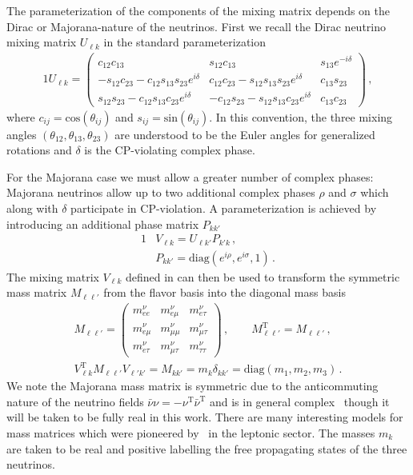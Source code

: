 The parameterization of the components of the mixing matrix depends on the Dirac or Majorana-nature of the neutrinos. First we recall the Dirac neutrino mixing matrix $U_{\ell k}$ in the standard parameterization~\citep{Schwartz:2014sze} 
\begin{alignat}{1}
    \label{rotation:1} U_{\ell k} =
    \begin{pmatrix}
         c_{12}c_{13} & s_{12}c_{13} & s_{13}e^{-i\delta}\\
         -s_{12}c_{23} - c_{12}s_{13}s_{23}e^{i\delta} & c_{12}c_{23} - s_{12}s_{13}s_{23}e^{i\delta} & c_{13}s_{23}\\
         s_{12}s_{23} - c_{12}s_{13}c_{23}e^{i\delta}& -c_{12}s_{23} - s_{12}s_{13}c_{23}e^{i\delta} & c_{13}c_{23}
    \end{pmatrix}\,,
\end{alignat}
where $c_{ij} = \mathrm{cos}(\theta_{ij})$ and $s_{ij} = \mathrm{sin}(\theta_{ij})$. In this convention, the three mixing angles $(\theta_{12}, \theta_{13}, \theta_{23})$ are understood to be the Euler angles for generalized rotations and $\delta$ is the CP-violating complex phase. 

For the Majorana case we must allow a greater number of complex phases: Majorana neutrinos allow up to two additional complex phases $\rho$ and $\sigma$ which along with $\delta$ participate in CP-violation. A parameterization is achieved by introducing an additional phase matrix $P_{kk'}$
\begin{alignat}{1}
    \label{phases:1} &V_{\ell k} = U_{\ell k'}P_{k'k}\,,\\
    \label{phases:3} &P_{kk'} = \mathrm{diag}(e^{i\rho},e^{i\sigma},1)\,.
\end{alignat}
The mixing matrix $V_{\ell k}$ defined in  can then be used to transform the symmetric mass matrix $M_{\ell\ell'}$ from the flavor basis into the diagonal mass basis 
\begin{align}
    \label{diag:0}
    M_{\ell\ell'}=
    \begin{pmatrix}
        m_{ee}^{\nu} & m_{e\mu}^{\nu} & m_{e\tau}^{\nu}\\
        m_{e\mu}^{\nu} & m_{\mu\mu}^{\nu} & m_{\mu\tau}^{\nu}\\
        m_{e\tau}^{\nu} & m_{\mu\tau}^{\nu} & m_{\tau\tau}^{\nu}
    \end{pmatrix}\,,\qquad
    M_{\ell\ell'}^\mathrm{T}=M_{\ell\ell'}\,,\\
    \label{diag:1}
    V_{\ell k}^\mathrm{T}M_{\ell\ell'}V_{\ell'k'} = M_{kk'} = m_{k}\delta_{kk'} = \mathrm{diag}(m_{1},m_{2},m_{3})\,.
\end{align}
We note the Majorana mass matrix is symmetric due to the anticommuting nature of the neutrino fields $\bar\nu\nu=-\nu^\mathrm{T}\bar\nu^\mathrm{T}$ and is in general complex~\citep{Adhikary:2013bma,giunti2007fundamentals} though it will be taken to be fully real in this work. There are many interesting models for mass matrices which were pioneered by~\cite{Fritzsch:1995dj,Fritzsch:1998xs,Fritzsch:1999ee,Xing:2000ik} in the leptonic sector. The masses $m_{k}$ are taken to be real and positive labelling the free propagating states of the three neutrinos.

